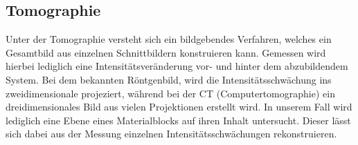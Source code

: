 \subsection{Tomographie}
Unter der Tomographie versteht sich ein bildgebendes Verfahren, welches ein Gesamtbild aus einzelnen Schnittbildern konstruieren kann. Gemessen wird hierbei
lediglich eine Intensitätsveränderung vor- und hinter dem abzubildendem System. 
Bei dem bekannten Röntgenbild, wird die Intensitätsschwächung ins zweidimensionale projeziert, während bei der CT (Computertomographie) ein dreidimensionales Bild aus vielen Projektionen erstellt wird. 
In unserem Fall wird lediglich eine Ebene eines Materialblocks auf ihren Inhalt untersucht. Dieser lässt sich dabei aus der Messung einzelnen Intensitätsschwächungen rekonstruieren. 